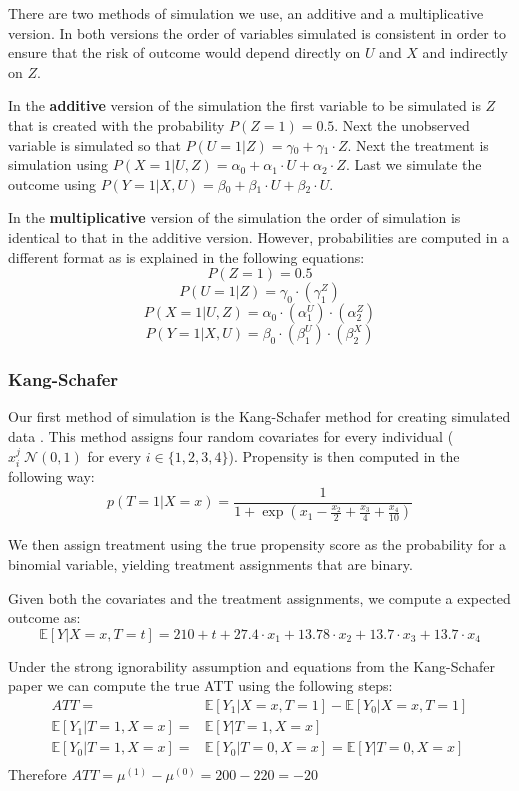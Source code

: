 \documentclass{article}
\begin{document}
There are two methods of simulation we use, an additive and a multiplicative version. In both versions the order of variables simulated is consistent in order to ensure that the risk of outcome would depend directly on $U$ and $X$ and indirectly on $Z$.

In the \textbf{additive} version of the simulation the first variable to be simulated is $Z$ that is created with the probability $P(Z=1)=0.5$.
Next the unobserved variable is simulated so that $P(U=1|Z)=\gamma{}_0 + \gamma{}_1\cdot{}Z$. Next the treatment is simulation using $P(X=1|U,Z) = \alpha{}_0 + \alpha{}_1 \cdot{} U + \alpha{}_2 \cdot{} Z$. Last we simulate the outcome using $P(Y=1|X,U) = \beta{}_0 + \beta{}_1 \cdot{} U + \beta{}_2 \cdot{} U$. 

In the \textbf{multiplicative} version of the simulation the order of simulation is identical to that in the additive version. However, probabilities are computed in a different format as is explained in the following equations:
$$P(Z=1)=0.5$$
$$P(U=1|Z)=\gamma_0\cdot{}(\gamma_1^Z)$$
$$P(X=1|U,Z)= \alpha_0\cdot(\alpha_1^U)\cdot(\alpha_2^Z)$$
$$P(Y=1|X,U) = \beta_0 \cdot (\beta_1^U) \cdot (\beta_2^X)$$

\subsubsection{Kang-Schafer}
Our first method of simulation is the Kang-Schafer method for creating simulated data \cite{kang2007demystifying}. This method assigns four random covariates for every individual ($x_i^j~\mathcal{N}(0,1)$ for every $i\in{}\{1,2,3,4\}$). 
Propensity is then computed in the following way:
\begin{equation*}
    p(T=1| X=x) = \frac{1}{1 + \exp{(x_1 - \frac{x_2}{2} + \frac{x_3}{4} + \frac{x_4}{10})}}
\end{equation*}

We then assign treatment using the true propensity score as the probability for a binomial variable, yielding treatment assignments that are binary. 

Given both the covariates and the treatment assignments, we compute a expected outcome as:
\begin{equation*}
    \mathbb{E}[Y|X=x, T=t] = 210 + t + 27.4 \cdot{} x_1 + 13.78 \cdot{} x_2 + 13.7 \cdot{} x_3 + 13.7 \cdot{} x_4
\end{equation*}

Under the strong ignorability assumption and equations from the Kang-Schafer paper we can compute the true ATT using the following steps:
\begin{equation*}
    \begin{split}
        ATT = & \mathbb{E}[Y_1 | X=x, T=1] - \mathbb{E}[Y_0 | X=x, T=1] \\
        \mathbb{E}[Y_1|T=1, X=x] = & \mathbb{E}[Y|T=1, X=x] \\
        \mathbb{E}[Y_0|T=1, X=x] = & \mathbb{E}[Y_0|T=0, X=x] = \mathbb{E}[Y|T=0, X=x] \\
    \end{split}
\end{equation*}
Therefore $ATT=\mu{}^{(1)} - \mu{}^{(0)} = 200-220 = -20$ 
\end{document}
